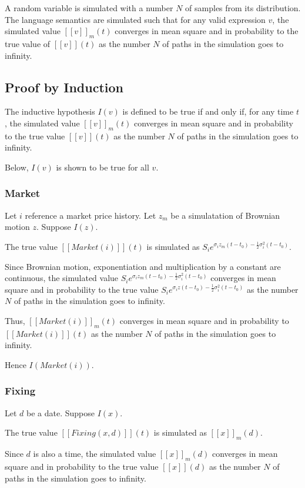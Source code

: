 \documentclass[a4paper,11pt]{article}
\newcommand{\sembrack}[1]{[\![#1]\!]}
\begin{document}
A random variable is simulated with a number $N$ of samples from its distribution. The language semantics are simulated such that for any valid expression $v$, the simulated value $\sembrack{v}_m(t)$ converges in mean square and in probability to the true value of $\sembrack{v}(t)$ as the number $N$ of paths in the simulation goes to infinity.


\subsection{Proof by Induction}
The inductive hypothesis $I(v)$ is defined to be true if and only if, for any time $t$, the simulated value $\sembrack{v}_m(t)$ converges in mean square and in probability to the true value $\sembrack{v}(t)$ as the number $N$ of paths in the simulation goes to infinity.

Below, $I(v)$ is shown to be true for all $v$.


\subsubsection{Market}

Let $i$ reference a market price history. Let $z_m$ be a simulatation of Brownian motion $z$. Suppose $I(z)$.

The true value $\sembrack{Market(i)}(t)$ is simulated as $S_i e^{\sigma_i z_m(t - t_0) - \frac{1}{2} \sigma_i^2 (t - t_0) }$.

Since Brownian motion, exponentiation and multiplication by a constant are continuous, the simulated value $S_i e^{\sigma_i z_m(t - t_0) - \frac{1}{2} \sigma_i^2 (t - t_0) }$ converges in mean square and in probability to the true value $S_i e^{\sigma_i z(t - t_0) - \frac{1}{2} \sigma_i^2 (t - t_0) }$ as the number $N$ of paths in the simulation goes to infinity.

Thus, $\sembrack{Market(i)}_m(t)$ converges in mean square and in probability to $\sembrack{Market(i)}(t)$ as the number $N$ of paths in the simulation goes to infinity.

Hence $I(Market(i))$.

\subsubsection{Fixing}
Let $d$ be a date. Suppose $I(x)$.

The true value $\sembrack{Fixing(x, d)}(t)$ is simulated as $ \sembrack{x}_m(d) $.

Since $d$ is also a time, the simulated value $ \sembrack{x}_m(d) $ converges in mean square and in probability to the true value $ \sembrack{x}(d) $ as the number $N$ of paths in the simulation goes to infinity.
\end{document}
